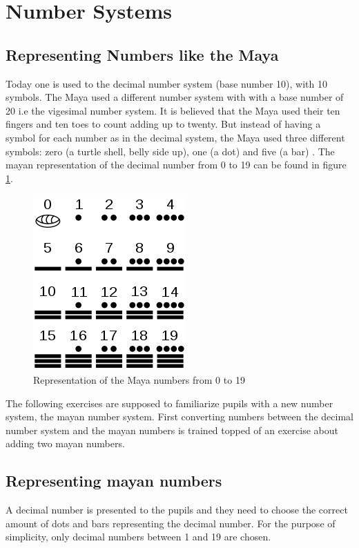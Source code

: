 \section{Number Systems}

\subsection{Representing Numbers like the Maya}

Today one is used to the decimal number system (base number 10), with 10 symbols. The Maya used a different number system with with a base number of 20 i.e the vigesimal number system. It is believed that the Maya used their ten fingers and ten toes to count adding up to twenty. But instead of having a symbol for each number as in the decimal system, the Maya used three different symbols: zero (a turtle shell, belly side up), one (a dot) and five (a bar) \cite{Maya}. The mayan representation of the decimal number from 0 to 19 can be found in figure \ref{fig:maya_numerals}.

\begin{figure} 
    \centering
    \includegraphics[width=0.3 \columnwidth]{figures/maya_number_system.png}
    \caption{Representation of the Maya numbers from 0 to 19} 
    \label{fig:maya_numerals} 
\end{figure}

The following exercises are supposed to familiarize pupils with a new number system, the mayan number system. First converting numbers between the decimal number system and the mayan numbers is trained topped of an exercise about adding two mayan numbers.

\subsection*{Representing mayan numbers}

A decimal number is presented to the pupils and they need to choose the correct amount of dots and bars representing the decimal number. For the purpose of simplicity, only decimal numbers between 1 and 19 are chosen.

